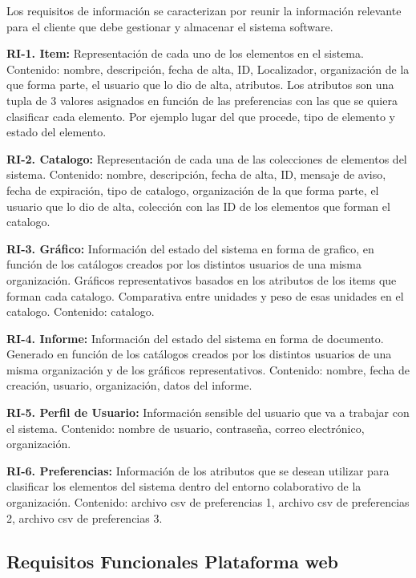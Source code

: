 \documentclass[a4paper,11pt]{book}
\begin{document}
Los requisitos de información se caracterizan por  reunir la información 	relevante para el cliente que debe gestionar y almacenar el sistema software.\par 

\textbf{RI-1. Item:} Representación de cada uno de los elementos en el sistema. 
Contenido: nombre, descripción, fecha de alta, ID, Localizador, organización de la que forma parte, el usuario que lo dio de alta, atributos. Los atributos son una tupla de 3 valores asignados en función de las preferencias con las que se quiera clasificar  cada elemento. Por ejemplo lugar del que procede, tipo de elemento y estado del elemento.


\textbf{RI-2. Catalogo:} Representación de cada una de las colecciones de elementos del sistema. Contenido: nombre, descripción, fecha de alta, ID, mensaje de aviso, fecha de expiración, tipo de catalogo,  organización de la que forma parte, el usuario que lo dio de alta, colección con las ID de los elementos que forman el catalogo.

\textbf{RI-3. Gráfico:} Información del estado del sistema en forma de grafico, en función de los catálogos creados por los distintos usuarios de una misma organización. Gráficos representativos basados en los atributos de los items que forman cada catalogo. Comparativa entre unidades y peso de esas unidades en el catalogo. 
Contenido: catalogo.

\textbf{RI-4. Informe:} Información del estado del sistema en forma de documento. Generado en función de los catálogos creados por los distintos usuarios de una misma organización y de los gráficos representativos. 
Contenido: nombre, fecha de creación, usuario, organización, datos del informe. 

\textbf{RI-5. Perfil de Usuario:} Información sensible del usuario que va a trabajar con el sistema. Contenido: nombre de usuario, contraseña, correo electrónico, organización. 

\textbf{RI-6. Preferencias:} Información de los atributos que se desean utilizar para clasificar los elementos del sistema dentro del entorno colaborativo de la organización.
Contenido: archivo csv de preferencias 1, archivo csv de preferencias 2, archivo csv de preferencias 3. 


\subsection{Requisitos Funcionales Plataforma web}
\end{document}

